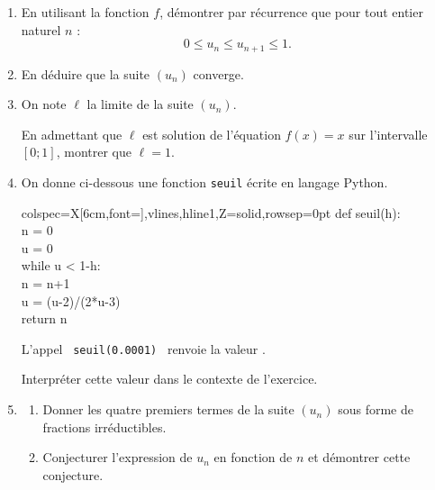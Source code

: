 	\begin{enumerate}
		\item En utilisant la fonction $f$, démontrer par récurrence que pour tout entier naturel $n$ :
		\[0 \leqslant  u_{n} \leqslant  u_{n+1} \leqslant  1.\]

		\item En déduire que la suite $(u_{n})$ converge.

		\item On note $\ell$ la limite de la suite $(u_{n})$.

		En admettant que $\ell$ est solution de l'équation $f(x)=x$ sur l'intervalle $[0 ; 1]$, montrer que $\ell=1$.

		\item On donne ci-dessous une fonction \texttt{seuil} écrite en langage Python.

		\begin{center}
		\begin{tblr}{colspec={X[6cm,font=\ttfamily]},vlines,hline{1,Z}={solid},rowsep=0pt}
			def seuil(h):\\
			\quad n = 0\\
			\quad u = 0\\
			\quad while u < 1-h:\\
			\quad \quad n = n+1\\
			\quad \quad u = (u-2)/(2*u-3)\\
			\quad return n\\
		\end{tblr}
		\end{center}

	L'appel ~\texttt{seuil(0.0001)}~ renvoie la valeur .

	Interpréter cette valeur dans le contexte de l'exercice.

	\item \begin{enumerate}
		\item Donner les quatre premiers termes de la suite $\left(u_{n}\right)$ sous forme de fractions irréductibles.

		\item Conjecturer l'expression de $u_{n}$ en fonction de $n$ et démontrer cette conjecture.
	\end{enumerate}
	\end{enumerate}
